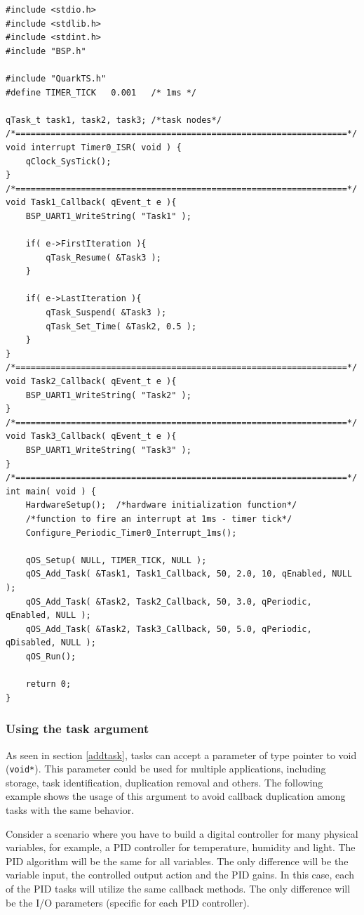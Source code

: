 \documentclass{article}
\begin{document}
\begin{lstlisting}[style=CStyle]
#include <stdio.h>
#include <stdlib.h>
#include <stdint.h>
#include "BSP.h"

#include "QuarkTS.h"
#define TIMER_TICK   0.001   /* 1ms */ 

qTask_t task1, task2, task3; /*task nodes*/
/*==================================================================*/
void interrupt Timer0_ISR( void ) {
    qClock_SysTick();   
}
/*==================================================================*/
void Task1_Callback( qEvent_t e ){
    BSP_UART1_WriteString( "Task1" );

    if( e->FirstIteration ){
        qTask_Resume( &Task3 );    
    }
    
    if( e->LastIteration ){
        qTask_Suspend( &Task3 );
        qTask_Set_Time( &Task2, 0.5 );
    }
}
/*==================================================================*/
void Task2_Callback( qEvent_t e ){
    BSP_UART1_WriteString( "Task2" );
}
/*==================================================================*/
void Task3_Callback( qEvent_t e ){
    BSP_UART1_WriteString( "Task3" );
}
/*==================================================================*/
int main( void ) {    
    HardwareSetup();  /*hardware initialization function*/
    /*function to fire an interrupt at 1ms - timer tick*/
    Configure_Periodic_Timer0_Interrupt_1ms(); 
    
    qOS_Setup( NULL, TIMER_TICK, NULL );     
    qOS_Add_Task( &Task1, Task1_Callback, 50, 2.0, 10, qEnabled, NULL );
    qOS_Add_Task( &Task2, Task2_Callback, 50, 3.0, qPeriodic, qEnabled, NULL );
    qOS_Add_Task( &Task2, Task3_Callback, 50, 5.0, qPeriodic, qDisabled, NULL );
    qOS_Run();
	
    return 0;
}
\end{lstlisting}

\subsubsection{Using the task argument}
As seen in section \ref{addtask}, tasks can accept a parameter of type pointer to void (\lstinline{void*}). 
This parameter could be used for multiple applications, including storage, task identification, duplication removal and others. The following example shows the usage of this argument to avoid callback duplication among tasks with the same behavior. 

Consider a scenario where you have to build a digital controller for many physical variables, for example, a PID controller for temperature, humidity and light. The PID algorithm will be the same for all variables. The only difference will be the variable input, the controlled output action and the PID gains. In this case, each of the PID tasks will utilize the same callback methods. The only difference will be the I/O parameters (specific for each PID controller). \\
\end{document}
